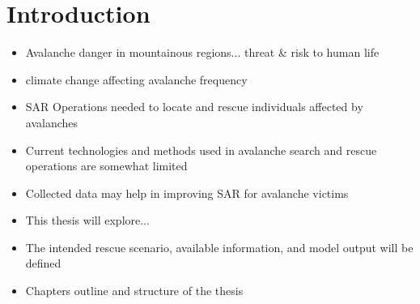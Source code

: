 \chapter{Introduction}

\begin{itemize}
\item Avalanche danger in mountainous regions... threat \& risk to human life
\item climate change affecting avalanche frequency 
\item SAR Operations needed to locate and rescue individuals affected by avalanches
\item Current technologies and methods used in avalanche search and rescue operations are somewhat limited
\item Collected data may help in improving SAR for avalanche victims
\item This thesis will explore...
\item The intended rescue scenario, available information, and model output will be defined
\item Chapters outline and structure of the thesis
\end{itemize}